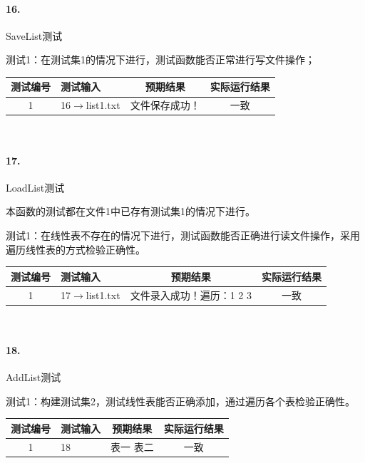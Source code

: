 \documentclass[supercite]{Experimental_Report}
\theoremstyle{definition}
\begin{document}
\paragraph{16.}SaveList测试
	
测试1：在测试集1的情况下进行，测试函数能否正常进行写文件操作；

\vspace{0.5em}

\begin{tabular}{|c|p{2.7cm}|c|c|}
	\hline
	测试编号 & 测试输入 & 预期结果 & 实际运行结果 \\
	\hline
	1 & 16$\rightarrow$list1.txt & 文件保存成功！ & 一致 \\
	\hline
\end{tabular}

~\

\paragraph{17.}LoadList测试
	
本函数的测试都在文件1中已存有测试集1的情况下进行。

测试1：在线性表不存在的情况下进行，测试函数能否正确进行读文件操作，采用遍历线性表的方式检验正确性。

\vspace{0.5em}

\begin{tabular}{|c|p{2.7cm}|c|c|}
	\hline
	测试编号 & 测试输入 & 预期结果 & 实际运行结果 \\
	\hline
	1 & 17$\rightarrow$list1.txt & 文件录入成功！遍历：1 2 3 & 一致 \\
	\hline
\end{tabular}

~\

\paragraph{18.}AddList测试

测试1：构建测试集2，测试线性表能否正确添加，通过遍历各个表检验正确性。

\vspace{0.5em}

\begin{tabular}{|c|p{2.7cm}|c|c|}
	\hline
	测试编号 & 测试输入 & 预期结果 & 实际运行结果 \\
	\hline
	1 & 18 & 表一 表二 & 一致 \\
	\hline
\end{tabular}
\end{document}
